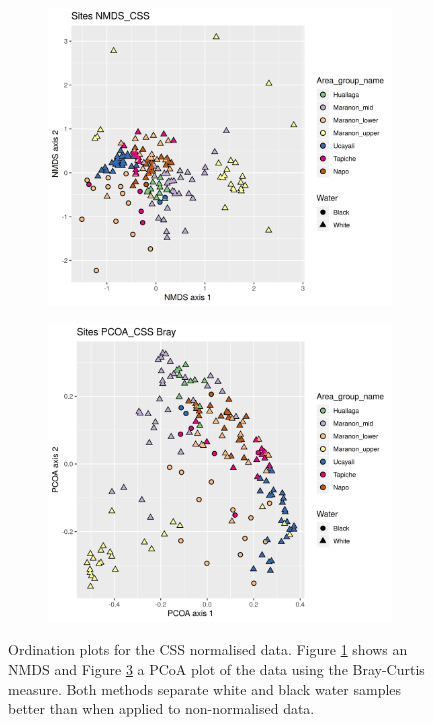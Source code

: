 \begin{figure}[h]
	\centering
	\begin{subfigure}{0.4\textwidth}
		\centering
		\includegraphics[width = \textwidth]{nmds12otucss}
		\caption{}
		\label{fig:nmds12otucss}
	\end{subfigure}
	\begin{subfigure}{0.4\textwidth}
		\centering
		\includegraphics[width = \textwidth]{pcoa12otucss}
		\caption{}
		\label{fig:pcoa12otucss}
	\end{subfigure}
	\caption{Ordination plots for the CSS normalised data. Figure \ref{fig:nmds12otucss} shows an NMDS and Figure \ref{fig:pcoa12otucss} a PCoA plot of the data using the Bray-Curtis measure. Both methods separate white and black water samples better than when applied to non-normalised data.}
\end{figure}

